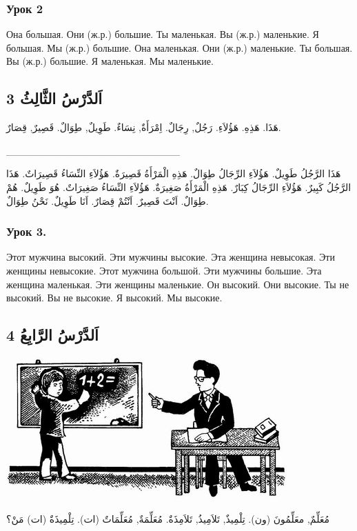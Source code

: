 \documentclass[a5paper]{article}
\begin{document}
\subsubsection{Урок 2}
Она большая. Они (ж.р.) большие. Ты маленькая. Вы (ж.р.) маленькие. Я большая. Мы (ж.р.) большие. Она маленькая. Они (ж.р.) маленькие. Ты большая. Вы (ж.р.) большие. Я маленькая. Мы маленькие.

\subsection{اَلدَّرْسُ الثَّالِثُ 3}
هَذَا. هَذِهِ. هَؤُلاَءِ. رَجُلٌ, رِجَالٌ. اِمْرَأَةٌ, نِسَاءٌ. طَوِيلٌ, طِوَالٌ. قَصِيرٌ, قِصَارٌ.

\_\_\_\_\_\_\_\_\_\_\_\_\_\_\_\_\_\_\_\_\_\_\_\_

هَذَا الرَّجُلُ طَوِيلٌ. هَؤُلاَءِ الرِّجَالُ طِوَالٌ. هَذِهِ الْمَرْأَةُ قَصِيرَةٌ. هَؤُلاَءِ النِّسَاءُ قَصِيرَاتٌ. هَذَا الرَّجُلُ كَبِيرٌ. هَؤُلاَءِ الرِّجَالُ كِبَارٌ. هَذِهِ الْمَرْأَةُ صَغِيرَةٌ. هَؤُلاَءِ النِّسَاءُ صَغِيرَاتٌ. هُوَ طَوِيلٌ. هُمْ طِوَالٌ. اَنْتَ قَصِيرٌ. اَنْتُمْ قِصَارٌ. اَنَا طَوِيلٌ. نَحْنُ طِوَالٌ.

\subsubsection{Урок 3.}
Этот мужчина высокий. Эти мужчины высокие. Эта женщина невысокая. Эти женщины невысокие. Этот мужчина большой. Эти мужчины большие. Эта женщина маленькая. Эти женщины маленькие. Он высокий. Они высокие. Ты не высокий. Вы не высокие. Я высокий. Мы высокие.

\subsection{اَلدَّرْسُ الرَّابِعُ 4}
 \includegraphics[width=4.2398in,height=2.1457in]{MuhammadBagauddinlatinized-img001.jpg} 

مُعَلِّمٌ, معَلِّمُونَ (ون). تِلْمِيذٌ, تَلاَمِيذُ, تَلاَمِذَةٌ. مُعَلِّمَةٌ, مُعَلِّمَاتٌ (ات). تِلْمِيذَةٌ (ات) مَنْ؟
\end{document}
